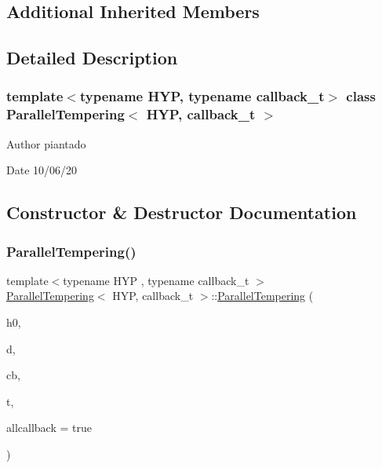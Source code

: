 \subsection*{Additional Inherited Members}


\subsection{Detailed Description}
\subsubsection*{template$<$typename H\+YP, typename callback\+\_\+t$>$\newline
class Parallel\+Tempering$<$ H\+Y\+P, callback\+\_\+t $>$}

\begin{DoxyAuthor}{Author}
piantado 
\end{DoxyAuthor}
\begin{DoxyDate}{Date}
10/06/20 
\end{DoxyDate}


\subsection{Constructor \& Destructor Documentation}
\mbox{\label{class_parallel_tempering_aec98f6abe3a51a3cf79b508ba176d290}} 
\subsubsection{\texorpdfstring{Parallel\+Tempering()}{ParallelTempering()}\hspace{0.1cm}{\footnotesize\ttfamily [1/2]}}
{\footnotesize\ttfamily template$<$typename H\+YP , typename callback\+\_\+t $>$ \\
\hyperlink{class_parallel_tempering}{Parallel\+Tempering}$<$ H\+YP, callback\+\_\+t $>$\+::\hyperlink{class_parallel_tempering}{Parallel\+Tempering} (\begin{DoxyParamCaption}\item[{H\+YP \&}]{h0,  }\item[{typename H\+Y\+P\+::data\+\_\+t $\ast$}]{d,  }\item[{callback\+\_\+t \&}]{cb,  }\item[{std\+::initializer\+\_\+list$<$ double $>$}]{t,  }\item[{bool}]{allcallback = {\ttfamily true} }\end{DoxyParamCaption})\hspace{0.3cm}{\ttfamily [inline]}}

